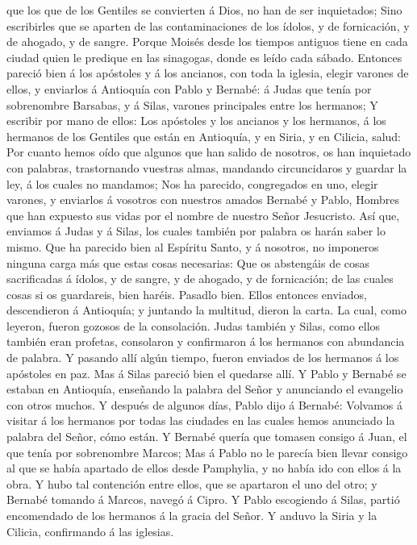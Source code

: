 que los que de los Gentiles se convierten á Dios, no han de ser
inquietados;  Sino escribirles que se aparten de las
contaminaciones de los ídolos, y de fornicación, y de ahogado, y de
sangre.  Porque Moisés desde los tiempos antiguos tiene
en cada ciudad quien le predique en las sinagogas, donde es leído cada
sábado.  Entonces pareció bien á los apóstoles y á los
ancianos, con toda la iglesia, elegir varones de ellos, y enviarlos á
Antioquía con Pablo y Bernabé: á Judas que tenía por sobrenombre
Barsabas, y á Silas, varones principales entre los hermanos;
 Y escribir por mano de ellos: Los apóstoles y los
ancianos y los hermanos, á los hermanos de los Gentiles que están en
Antioquía, y en Siria, y en Cilicia, salud:  Por cuanto
hemos oído que algunos que han salido de nosotros, os han inquietado con
palabras, trastornando vuestras almas, mandando circuncidaros y guardar
la ley, á los cuales no mandamos;  Nos ha parecido,
congregados en uno, elegir varones, y enviarlos á vosotros con nuestros
amados Bernabé y Pablo,  Hombres que han expuesto sus
vidas por el nombre de nuestro Señor Jesucristo.  Así
que, enviamos á Judas y á Silas, los cuales también por palabra os harán
saber lo mismo.  Que ha parecido bien al Espíritu Santo,
y á nosotros, no imponeros ninguna carga más que estas cosas necesarias:
 Que os abstengáis de cosas sacrificadas á ídolos, y de
sangre, y de ahogado, y de fornicación; de las cuales cosas si os
guardareis, bien haréis. Pasadlo bien.  Ellos entonces
enviados, descendieron á Antioquía; y juntando la multitud, dieron la
carta.  La cual, como leyeron, fueron gozosos de la
consolación.  Judas también y Silas, como ellos también
eran profetas, consolaron y confirmaron á los hermanos con abundancia de
palabra.  Y pasando allí algún tiempo, fueron enviados de
los hermanos á los apóstoles en paz.  Mas á Silas pareció
bien el quedarse allí.  Y Pablo y Bernabé se estaban en
Antioquía, enseñando la palabra del Señor y anunciando el evangelio con
otros muchos.  Y después de algunos días, Pablo dijo á
Bernabé: Volvamos á visitar á los hermanos por todas las ciudades en las
cuales hemos anunciado la palabra del Señor, cómo están. 
Y Bernabé quería que tomasen consigo á Juan, el que tenía por
sobrenombre Marcos;  Mas á Pablo no le parecía bien
llevar consigo al que se había apartado de ellos desde Pamphylia, y no
había ido con ellos á la obra.  Y hubo tal contención
entre ellos, que se apartaron el uno del otro; y Bernabé tomando á
Marcos, navegó á Cipro.  Y Pablo escogiendo á Silas,
partió encomendado de los hermanos á la gracia del Señor.
 Y anduvo la Siria y la Cilicia, confirmando á las
iglesias.

